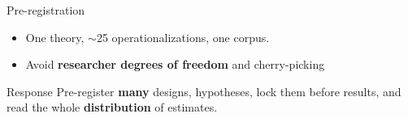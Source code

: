 \documentclass[aspectratio=169,11pt]{beamer}
\newcommand{\key}[1]{\textcolor{agentblue}{\textbf{#1}}}
\begin{document}
\begin{frame}{Pre-registration}
  \begin{itemize}
    \item One theory, $\sim$25 operationalizations, one corpus.
    \item Avoid \key{researcher degrees of freedom} and cherry-picking 
  \end{itemize}
  \vspace{0.9em}
  \begin{block}{Response}
    Pre-register \key{many} designs, hypotheses, lock them before results, and read the
    whole \key{distribution} of estimates.
  \end{block}
\end{frame}
\end{document}
